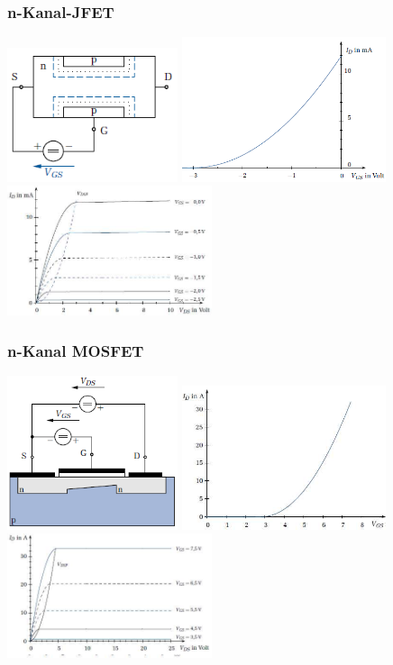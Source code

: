 \subsubsection{n-Kanal-JFET}
\includegraphics[width=5cm]{bilder/jFET}
\includegraphics[width=6cm]{bilder/jFetSteuerKennlinie}
\includegraphics[width=6cm]{bilder/jFetAusgangsKennlinie}\\

\subsubsection{n-Kanal MOSFET}

\includegraphics[width=5cm]{bilder/MOSFET}
\includegraphics[width=6cm]{bilder/MOSFETSteuerKennlinie}
\includegraphics[width=6cm]{bilder/MOSFETAusgangsKennlinie}\\

